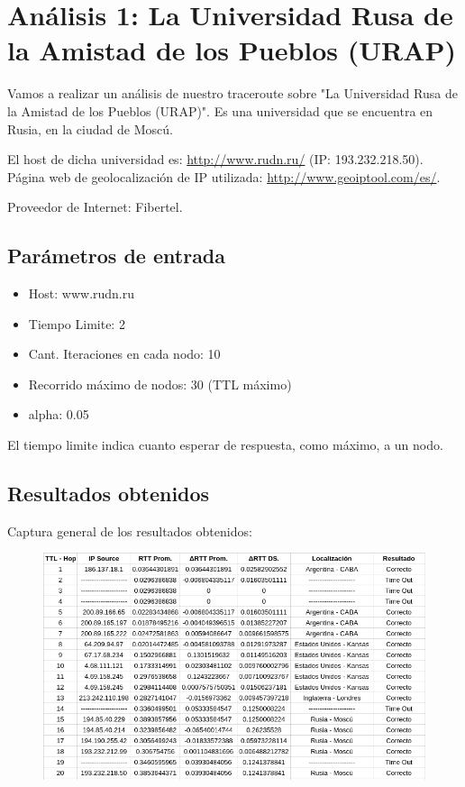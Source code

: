 \section{An\'alisis 1: La Universidad Rusa de la Amistad de los Pueblos (URAP)}
Vamos a realizar un an\'alisis de nuestro traceroute sobre "La Universidad Rusa de la Amistad de los Pueblos (URAP)". Es una universidad que se encuentra en Rusia, en la ciudad de Mosc\'u.\newline

El host de dicha universidad es: \url{http://www.rudn.ru/} (IP: 193.232.218.50).\\
	
Página web de geolocalización de IP utilizada: \url{http://www.geoiptool.com/es/}.

Proveedor de Internet: Fibertel.

\subsection{Par\'ametros de entrada}
\begin{itemize}
\item Host: www.rudn.ru
\item Tiempo Limite: 2
\item Cant. Iteraciones en cada nodo: 10
\item Recorrido m\'aximo de nodos: 30 (TTL m\'aximo)
\item alpha: 0.05
\end{itemize}
El tiempo limite indica cuanto esperar de respuesta, como m\'aximo, a un nodo.\newline

\subsection{Resultados obtenidos}

Captura general de los resultados obtenidos:

\begin{figure}[h]
    \includegraphics[width=1\textwidth]{img_analisis1/tabla.png}
    
\end{figure}
\vspace{0.25cm}



